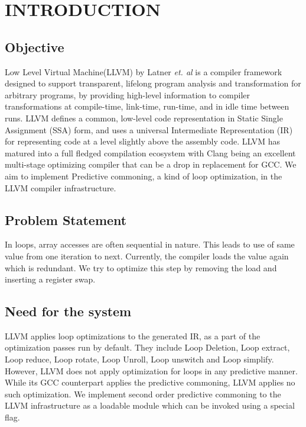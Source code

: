 
\chapter{INTRODUCTION} %
\section{Objective} %
Low Level Virtual Machine(LLVM) by Latner \textsl{et. al} \cite{Lattner:2004:LCF:977395.977673} is a compiler framework designed to support transparent, lifelong program analysis and transformation for arbitrary programs, by providing high-level information to compiler transformations at compile-time, link-time, run-time, and in idle time between runs. LLVM defines a common, low-level code representation in Static Single Assignment (SSA) form, and uses a universal Intermediate Representation (IR) for representing code at a level slightly above the assembly code. LLVM has matured into a full fledged compilation ecosystem with Clang being an excellent multi-stage optimizing compiler that can be a drop in replacement for GCC. We aim to implement Predictive commoning, a kind of loop optimization, in the LLVM compiler infrastructure.

\section{Problem Statement}
In loops, array accesses are often sequential in nature. This leads to use of same value from one iteration to next. Currently, the compiler loads the  value again which is redundant. We try to optimize this step by removing the load and inserting a register swap. 

\section{Need for the system}
LLVM applies loop optimizations to the generated IR, as a part of the optimization passes run by default. They include Loop Deletion, Loop extract, Loop reduce, Loop rotate, Loop Unroll, Loop unswitch and Loop simplify. However, LLVM does not apply optimization for loops in any predictive manner. While its GCC counterpart applies the predictive commoning, LLVM applies no such optimization. We implement second order predictive commoning to the LLVM infrastructure as a loadable module which can be invoked using a special flag.


